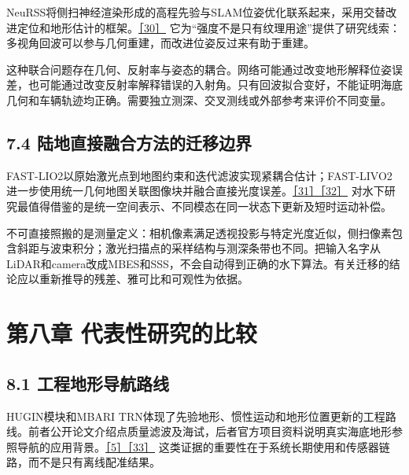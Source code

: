 NeuRSS将侧扫神经渲染形成的高程先验与SLAM位姿优化联系起来，采用交替改进定位和地形估计的框架。\href{https://arxiv.org/abs/2405.05807}{［30］} 它为``强度不是只有纹理用途''提供了研究线索：多视角回波可以参与几何重建，而改进位姿反过来有助于重建。

这种联合问题存在几何、反射率与姿态的耦合。网络可能通过改变地形解释位姿误差，也可能通过改变反射率解释错误的入射角。只有回波拟合变好，不能证明海底几何和车辆轨迹均正确。需要独立测深、交叉测线或外部参考来评价不同变量。

\hypertarget{ux9646ux5730ux76f4ux63a5ux878dux5408ux65b9ux6cd5ux7684ux8fc1ux79fbux8fb9ux754c}{%
\subsection{7.4 陆地直接融合方法的迁移边界}\label{ux9646ux5730ux76f4ux63a5ux878dux5408ux65b9ux6cd5ux7684ux8fc1ux79fbux8fb9ux754c}}

FAST-LIO2以原始激光点到地图约束和迭代滤波实现紧耦合估计；FAST-LIVO2进一步使用统一几何地图关联图像块并融合直接光度误差。\href{https://arxiv.org/abs/2107.06829}{［31］}\href{https://arxiv.org/abs/2408.14035}{［32］} 对水下研究最值得借鉴的是统一空间表示、不同模态在同一状态下更新及短时运动补偿。

不可直接照搬的是测量定义：相机像素满足透视投影与特定光度近似，侧扫像素包含斜距与波束积分；激光扫描点的采样结构与测深条带也不同。把输入名字从LiDAR和camera改成MBES和SSS，不会自动得到正确的水下算法。有关迁移的结论应以重新推导的残差、雅可比和可观性为依据。

\hypertarget{ux7b2cux516bux7ae0-ux4ee3ux8868ux6027ux7814ux7a76ux7684ux6bd4ux8f83}{%
\section{第八章 代表性研究的比较}\label{ux7b2cux516bux7ae0-ux4ee3ux8868ux6027ux7814ux7a76ux7684ux6bd4ux8f83}}

\hypertarget{ux5de5ux7a0bux5730ux5f62ux5bfcux822aux8defux7ebf}{%
\subsection{8.1 工程地形导航路线}\label{ux5de5ux7a0bux5730ux5f62ux5bfcux822aux8defux7ebf}}

HUGIN模块和MBARI TRN体现了先验地形、惯性运动和地形位置更新的工程路线。前者公开论文介绍点质量滤波及海试，后者官方项目资料说明真实海底地形参照导航的应用背景。\href{https://www.navlab.net/Publications/The_HUGIN_AUV_Terrain_Navigation_Module.pdf}{［5］}\href{https://www.mbari.org/project/terrain-relative-navigation/}{［33］} 这类证据的重要性在于系统长期使用和传感器链路，而不是只有离线配准结果。


